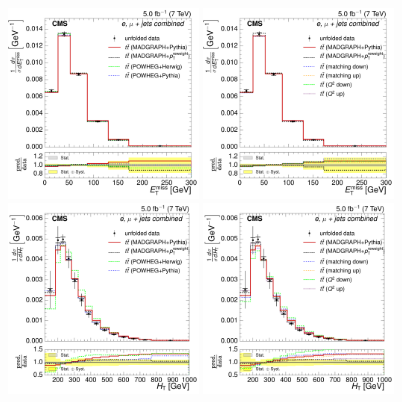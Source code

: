 \begin{figure}[hbtp]
    \centering
     \includegraphics[width=0.45\textwidth]{Chapters/04_Analysis/04b_XSections/images/results/fit/7TeV/MET/central/normalised_xsection_combined_different_generators.pdf}\hfill
     \includegraphics[width=0.45\textwidth]{Chapters/04_Analysis/04b_XSections/images/results/fit/7TeV/MET/central/normalised_xsection_combined_systematics_shifts.pdf}\\
     \includegraphics[width=0.45\textwidth]{Chapters/04_Analysis/04b_XSections/images/results/fit/7TeV/HT/central/normalised_xsection_combined_different_generators.pdf}\hfill
     \includegraphics[width=0.45\textwidth]{Chapters/04_Analysis/04b_XSections/images/results/fit/7TeV/HT/central/normalised_xsection_combined_systematics_shifts.pdf}\\

\end{figure}
